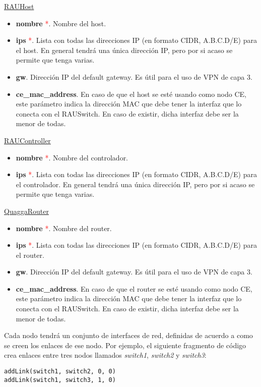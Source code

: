 \underline{RAUHost}

\begin{itemize}
	\item \textbf{nombre} \textcolor{red}{*}. Nombre del host.
	\item \textbf{ips} \textcolor{red}{*}. Lista con todas las direcciones IP (en formato CIDR, A.B.C.D/E) para el host. En general tendrá una única dirección IP, pero por si acaso se permite que tenga varias.
	\item \textbf{gw}.  Dirección IP del default gateway. Es útil para el uso de VPN de capa 3.
	\item \textbf{ce\_mac\_address}. En caso de que el host se esté usando como nodo CE, este parámetro indica la dirección MAC que debe tener la interfaz que lo conecta con el RAUSwitch. En caso de existir, dicha interfaz debe ser la menor de todas.
\end{itemize}

\underline{RAUController}

\begin{itemize}
	\item \textbf{nombre} \textcolor{red}{*}. Nombre del controlador.
	\item \textbf{ips} \textcolor{red}{*}. Lista con todas las direcciones IP (en formato CIDR, A.B.C.D/E) para el controlador. En general tendrá una única dirección IP, pero por si acaso se permite que tenga varias.
\end{itemize}

\underline{QuaggaRouter}

\begin{itemize}
	\item \textbf{nombre} \textcolor{red}{*}. Nombre del router.
	\item \textbf{ips} \textcolor{red}{*}. Lista con todas las direcciones IP (en formato CIDR, A.B.C.D/E) para el router.
	\item \textbf{gw}.  Dirección IP del default gateway. Es útil para el uso de VPN de capa 3.
	\item \textbf{ce\_mac\_address}. En caso de que el router se esté usando como nodo CE, este parámetro indica la dirección MAC que debe tener la interfaz que lo conecta con el RAUSwitch. En caso de existir, dicha interfaz debe ser la menor de todas.
\end{itemize}

Cada nodo tendrá un conjunto de interfaces de red, definidas de acuerdo a como se creen los enlaces de ese nodo. Por ejemplo, el siguiente fragmento de código crea enlaces entre tres nodos llamados \textit{switch1}, \textit{switch2} y \textit{switch3}:
\begin{lstlisting}
addLink(switch1, switch2, 0, 0)
addLink(switch1, switch3, 1, 0)
\end{lstlisting}


